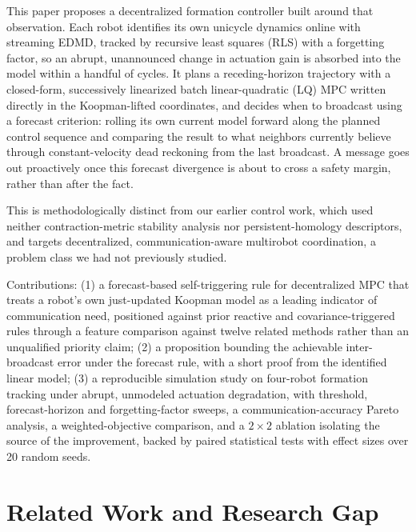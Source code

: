 \documentclass[10pt,conference]{IEEEtran}
\begin{document}
This paper proposes a decentralized formation controller built around that observation. Each robot identifies its own unicycle dynamics online with streaming EDMD, tracked by recursive least squares (RLS) with a forgetting factor, so an abrupt, unannounced change in actuation gain is absorbed into the model within a handful of cycles. It plans a receding-horizon trajectory with a closed-form, successively linearized batch linear-quadratic (LQ) MPC written directly in the Koopman-lifted coordinates, and decides when to broadcast using a forecast criterion: rolling its own current model forward along the planned control sequence and comparing the result to what neighbors currently believe through constant-velocity dead reckoning from the last broadcast. A message goes out proactively once this forecast divergence is about to cross a safety margin, rather than after the fact.

This is methodologically distinct from our earlier control work, which used neither contraction-metric stability analysis nor persistent-homology descriptors, and targets decentralized, communication-aware multirobot coordination, a problem class we had not previously studied.

Contributions: (1) a forecast-based self-triggering rule for decentralized MPC that treats a robot's own just-updated Koopman model as a leading indicator of communication need, positioned against prior reactive and covariance-triggered rules through a feature comparison against twelve related methods rather than an unqualified priority claim; (2) a proposition bounding the achievable inter-broadcast error under the forecast rule, with a short proof from the identified linear model; (3) a reproducible simulation study on four-robot formation tracking under abrupt, unmodeled actuation degradation, with threshold, forecast-horizon and forgetting-factor sweeps, a communication-accuracy Pareto analysis, a weighted-objective comparison, and a $2\times2$ ablation isolating the source of the improvement, backed by paired statistical tests with effect sizes over 20 random seeds.

\section{Related Work and Research Gap}
\end{document}
